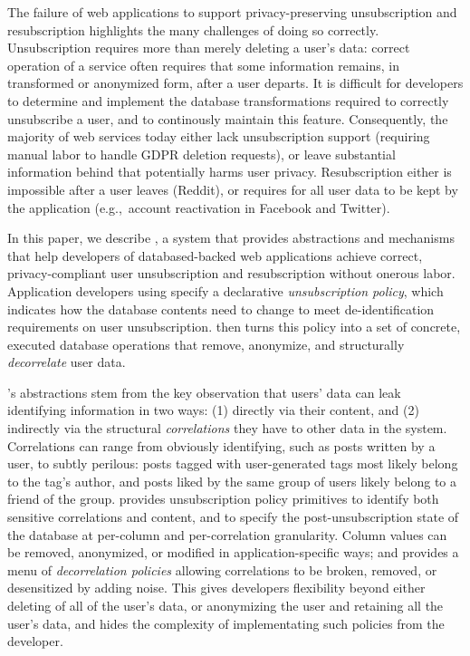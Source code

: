 The failure of web applications to support privacy-preserving unsubscription and resubscription  
highlights the many challenges of doing so correctly.
%
Unsubscription requires more than merely deleting a user's data: correct operation
of a service often requires that some information remains, in transformed or
anonymized form, after a user departs.
%
%
It is difficult for developers to determine and implement the database
transformations required to correctly unsubscribe a user, and to continously
maintain this feature.
%
Consequently, the majority of web services today either lack unsubscription support
(requiring manual labor to handle \eg GDPR deletion requests), or leave substantial
information behind that potentially harms user privacy.
%
Resubscription either is impossible after a user leaves (\eg Reddit), or requires for all user data
to be kept by the application (e.g.,\ account reactivation in Facebook and Twitter).

In this paper, we describe \sys, a system that provides abstractions and mechanisms
that help developers of databased-backed web applications achieve correct,
privacy-compliant user unsubscription and resubscription without onerous labor.
%
Application developers using \sys specify a declarative \emph{unsubscription policy},
which indicates how the database contents need to change to meet de-identification
requirements on user unsubscription.
%
\sys then turns this policy into a set of concrete, executed database operations that remove,
anonymize, and structurally \emph{decorrelate} user data.

\sys's abstractions stem from the key observation that users' data can leak identifying information
in two ways: (1) directly via their content, and (2) indirectly via the structural
\emph{correlations} they have to other data in the system.  Correlations can range from obviously
identifying, such as posts written by a user, to subtly perilous: posts tagged with user-generated
tags most likely belong to the tag's author, and posts liked by the same group of users likely
belong to a friend of the group.
%
\sys provides unsubscription policy primitives to identify both sensitive correlations and content,
and to specify the post-unsubscription state of the database at per-column and per-correlation
granularity. Column values can be removed, anonymized, or modified in application-specific ways; and
\sys provides a menu of \emph{decorrelation policies} allowing correlations to be broken, removed,
or desensitized by adding noise.  This gives developers flexibility beyond either deleting of all of
the user's data, or anonymizing the user and retaining all the user's data, and \sys hides the
complexity of implementating such policies from the developer.

